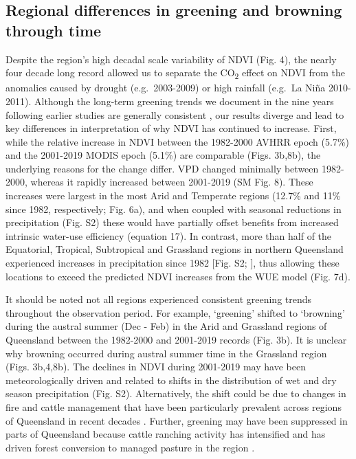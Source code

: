 \documentclass[gc, manuscript]{copernicus}
\begin{document}
\subsection{Regional differences in greening and browning through time}

Despite the region's high decadal scale variability of NDVI (Fig. 4),
the nearly four decade long record allowed us to separate the
CO\textsubscript{2} effect on NDVI from the anomalies caused by drought
(e.g.~2003-2009) or high rainfall (e.g.~La Niña 2010-2011). Although the
long-term greening trends we document in the nine years following
earlier studies are generally consistent
\citep{donohueClimaterelatedTrendsAustralian2009c, ukkolaReducedStreamflowWaterstressed2016b},
our results diverge and lead to key differences in interpretation of why
NDVI has continued to increase. First, while the relative increase in
NDVI between the 1982-2000 AVHRR epoch (5.7\%) and the 2001-2019 MODIS
epoch (5.1\%) are comparable (Figs. 3b,8b), the underlying reasons for
the change differ. VPD changed minimally between 1982-2000, whereas it
rapidly increased between 2001-2019 (SM Fig. 8). These increases were
largest in the most Arid and Temperate regions (12.7\% and 11\% since
1982, respectively; Fig. 6a), and when coupled with seasonal reductions
in precipitation (Fig. S2) these would have partially offset benefits
from increased intrinsic water-use efficiency (equation 17). In
contrast, more than half of the Equatorial, Tropical, Subtropical and
Grassland regions in northern Queensland experienced increases in
precipitation since 1982 {[}Fig. S2;
\citet{ukkolaExploringStationarityAustralian2019c}{]}, thus allowing
these locations to exceed the predicted NDVI increases from the WUE
model (Fig. 7d).

It should be noted not all regions experienced consistent greening
trends throughout the observation period. For example, `greening'
shifted to `browning' during the austral summer (Dec - Feb) in the Arid
and Grassland regions of Queensland between the 1982-2000 and 2001-2019
records (Fig. 3b). It is unclear why browning occurred during austral
summer time in the Grassland region (Figs. 3b,4,8b). The declines in
NDVI during 2001-2019 may have been meteorologically driven and related
to shifts in the distribution of wet and dry season precipitation (Fig.
S2). Alternatively, the shift could be due to changes in fire and cattle
management that have been particularly prevalent across regions of
Queensland in recent decades \citep{seabrookCattleCropsClearing2006}.
Further, greening may have been suppressed in parts of Queensland
because cattle ranching activity has intensified and has driven forest
conversion to managed pasture in the region
\citep{mcalpineIncreasingWorldConsumption2009}.
\end{document}
